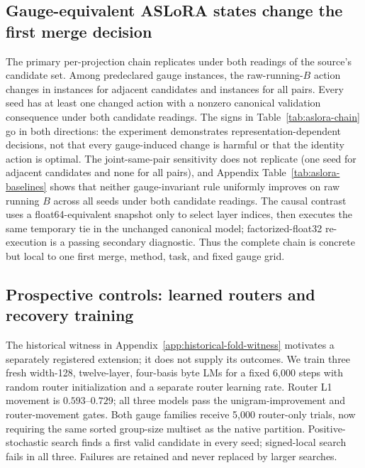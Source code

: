 

\subsection{Gauge-equivalent ASLoRA states change the first merge decision}
\label{sec:aslora-results}



The primary per-projection chain replicates under both readings of the source's
candidate set.  Among \ASLORATotalGaugeInstances{} predeclared gauge instances,
the raw-running-$B$ action changes in
\ASLORAAdjacentPrimaryChanges{} instances for adjacent candidates and
\ASLORAAllPrimaryChanges{} instances for all pairs.  Every seed has at least
one changed action with a nonzero canonical validation consequence under both
candidate readings.  The signs in Table~\ref{tab:aslora-chain} go in both
directions: the experiment demonstrates representation-dependent decisions,
not that every gauge-induced change is harmful or that the identity action is
optimal.  The joint-same-pair sensitivity does not replicate (one seed for
adjacent candidates and none for all pairs), and Appendix
Table~\ref{tab:aslora-baselines} shows that neither gauge-invariant rule
uniformly improves on raw running \(B\) across all seeds under both candidate
readings.  The causal contrast uses a
float64-equivalent snapshot only to select layer indices, then executes the
same temporary tie in the unchanged canonical model; factorized-float32
re-execution is a passing secondary diagnostic.  Thus the complete chain is
concrete but local to one first merge, method, task, and fixed gauge grid.

\subsection{Prospective controls: learned routers and recovery training}
\label{sec:enhanced-decisions}

The historical witness in Appendix~\ref{app:historical-fold-witness}
motivates a separately registered extension;
it does not supply its outcomes. We train three fresh width-128, twelve-layer,
four-basis byte LMs for a fixed 6,000 steps with random router initialization
and a separate router learning rate. Router L1 movement is $0.593$--$0.729$;
all three models pass the unigram-improvement and router-movement gates.
Both gauge families receive 5,000 router-only trials, now requiring the same
sorted group-size multiset as the native partition. Positive-stochastic
search finds a first valid candidate in every seed; signed-local search fails
in all three. Failures are retained and never replaced by larger searches.

